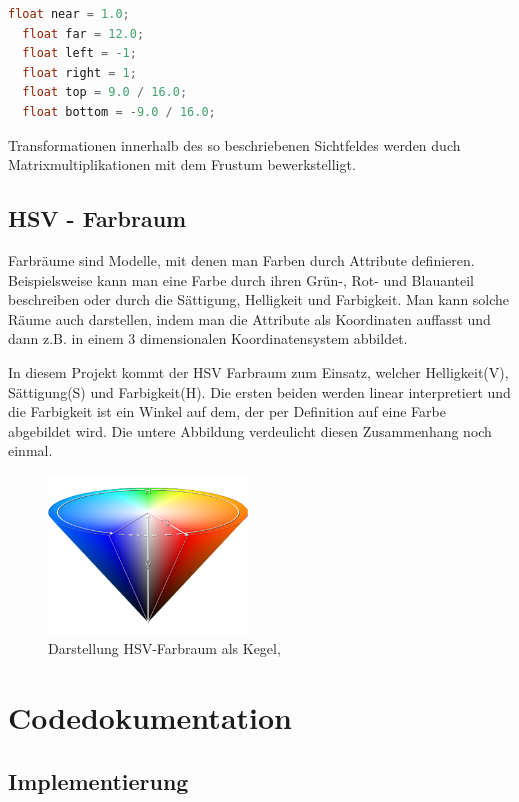 \documentclass[11pt]{article}
\begin{document}
\begin{lstlisting}[language=C]
  float near = 1.0;
  float far = 12.0;
  float left = -1;
  float right = 1;
  float top = 9.0 / 16.0;
  float bottom = -9.0 / 16.0;

\end{lstlisting}
Transformationen innerhalb des so beschriebenen Sichtfeldes werden duch Matrixmultiplikationen mit dem Frustum bewerkstelligt.

\subsection{HSV - Farbraum}

Farbräume sind Modelle, mit denen man Farben durch Attribute definieren. 
Beispielsweise kann man eine Farbe durch ihren Grün-, Rot- und Blauanteil beschreiben oder 
durch die Sättigung, Helligkeit und Farbigkeit. Man kann solche Räume auch darstellen, indem man 
die Attribute als Koordinaten auffasst und dann z.B. in einem 3 dimensionalen Koordinatensystem abbildet. 
\cite{CS1}

In diesem Projekt kommt der HSV Farbraum zum Einsatz, welcher Helligkeit(V), Sättigung(S) und Farbigkeit(H).
Die ersten beiden werden linear interpretiert und die Farbigkeit ist ein Winkel auf dem, der per Definition auf eine Farbe abgebildet wird.
Die untere Abbildung verdeulicht diesen Zusammenhang noch einmal. 
\cite{CS2}
\begin{figure}[h]
  \centering
  \includegraphics[width=200px]{../images/hsv.png}
  \caption{Darstellung HSV-Farbraum als Kegel, \cite{picWiki}}
\end{figure}

\pagebreak

\section{Codedokumentation}


\subsection{Implementierung} 
\end{document}
